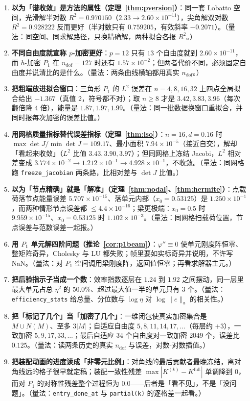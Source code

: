 \begin{enumerate}
  是光滑问题的增益；界面问题的对偶问题带同一个系数跳、只有 $H^{3/2-\epsilon}$，增益只有 $1/2$。（量法：同一批网格上比两种范数的斜率。）
  \item \textbf{以为「谱收敛」是方法的属性（定理~\ref{thm:pversion}）}：同一套 Lobatto 空间，光滑解半对数
  $R^2=0.970150$（$2.33\to2.60\times10^{-11}$），尖角解双对数 $R^2=0.928222$ 反而更好（半对数只有 $0.759205$，有效斜率
  $-0.2071$）。（量法：同空间、同求解路径，只换精确解，两种拟合各报 $R^2$。）
  \item \textbf{不同自由度就宣称 $p$-加密更好}：$p=12$ 只有 $13$ 个自由度就到 $2.60\times10^{-11}$，而 $h$-加密 $P_1$ 在
  $n_{\text{dof}}=127$ 时还有 $1.57\times10^{-2}$；但两者代价不同，必须固定自由度并说清比的是什么。（量法：两条曲线横轴都用真实
  $n_{\text{dof}}$。）
  \item \textbf{把粗端放进拟合窗口}：三角形 $P_1$ 的 $L^2$ 误差在 $n=4,8,16,32$ 上四点全局拟合给出 $-1.367$（真值
  $2$，符号都不对）；取 $n\ge8$ 才是 $3.42,3.83,3.96$（每次翻倍降 $4$ 倍），能量是
  $1.87,1.97,1.99$。（量法：同一批数据换窗口重拟合，并同时报每次加密的误差比值。）
  \item \textbf{用网格质量指标替代误差指标（定理~\ref{thm:iso}）}：$n=16,d=0.16$ 时 $\max\det J/\min\det J=109.17$、最小面积
  $7.94\times10^{-5}$（接近自交），解却「看起来收敛」（$L^2$ 比值 $3.43,3.90,3.97$）；但同网格上冻结 Jacobi，$L^2$ 相对差变成
  $3.774\times10^{-2}\to1.212\times10^{-1}\to4.928\times10^{-1}$，不收敛。（量法：同网格跑
  \texttt{freeze\_jacobian} 两条路，比相对差与 $\det J$ 比值。）
  \item \textbf{以为「节点精确」就是「解准」（定理~\ref{thm:nodal}、\ref{thm:hermite}）}：点载荷落节点能量误差 $5.707\times10^{-15}$、落单元内部（$x_0=0.53125$）是
  $1.250\times10^{-1}$，而两种情形节点误差都 $\le4.4\times10^{-16}$；梁更极端：$x_0=0.5$ 时
  $9.959\times10^{-15}$、$x_0=0.53125$ 时 $1.102\times10^{-3}$。（量法：同网格扫载荷位置，节点误差与范数误差一起报。）
  \item \textbf{用 $P_1$ 单元解四阶问题（推论~\ref{cor:p1beam}）}：$\varphi''\equiv0$ 使单元刚度阵恒零、整矩阵奇异，Cholesky 与 LU
  都失败；帧里要如实标奇异并说明，不许写 NaN。（量法：对 $P_1$ 空间调用梁刚度阵，返回值恒零；再看求解器主元。）
  \item \textbf{把后验指示子当成一个数}：效率指数逐层在 $1.24$ 到 $1.92$ 之间摆动，同一层里最大单元占总 $\eta^2$ 的
  $50.0\%$、超过最大值一半的单元只有 $3$ 个。（量法：\texttt{efficiency\_stats} 给总量、分位数与 $\log\eta$ 对 $\log\|e\|_a$
  的相关性。）
  \item \textbf{把「标记了几个」当「加密了几个」}：一维闭包使真实加密集合是 $M\cup N(M)$、至多 $3|M|$；自适应自由度
  $5,8,11,14,17,\dots$（每层约 $+3$），一致加密 $5,9,17,33,\dots$；最后自适应 $34$ 个自由度对一致加密 $2049$ 个，误差比
  $0.125$。（量法：读两条历史的真实 $n_{\text{dof}}$ 与误差，对数-对数插值。）
  \item \textbf{把装配动画的进度读成「非零元比例」}：对角线的最后贡献者最晚冻结，离对角线远的格子很早就定稿；装配一致性残差
  $\max|K^{(k)}-K^{\text{full}}|$ 单调降到 $0$，而对 $P_1$ 的对称性残差整个过程恒为
  $0.0$——后者是「看不见」，不是「没问题」。（量法：\texttt{entry\_done\_at} 与 \texttt{partial(k)} 的逐格差一起看。）
\end{enumerate}


